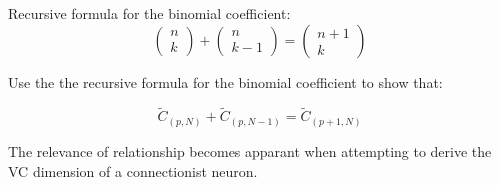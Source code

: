 \begin{frame}
Recursive formula for the binomial coefficient:
\begin{equation}
			\left( \begin{array}{c}
			n\\
			k
			\end{array}\right)+
			\left( \begin{array}{c}
			n\\
			k-1
			\end{array}\right)=
			\left( \begin{array}{c}
			n+1\\
			k
			\end{array}\right)
\end{equation}

Use the the recursive formula for the binomial coefficient to show that:

\begin{equation}
\tilde C_{(p,N)}+\tilde C_{(p,N-1)}=\tilde C_{(p+1,N)}
\label{eq:c_relation}
\end{equation}

The relevance of \notesonly{\eqref{eq:c_relation}} relationship becomes apparant when attempting to derive the VC dimension  of a connectionist neuron.

\end{frame}

